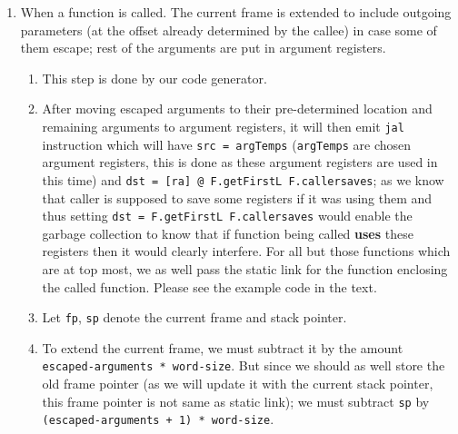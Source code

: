\begin{enumerate}
\def\labelenumi{\arabic{enumi}.}
\item
  When a function is called. The current frame is extended to include
  outgoing parameters (at the offset already determined by the callee)
  in case some of them escape; rest of the arguments are put in argument
  registers.

  \begin{enumerate}
  \def\labelenumii{\arabic{enumii}.}
  \item
    This step is done by our code generator.
  \item
    After moving escaped arguments to their pre-determined location and
    remaining arguments to argument registers, it will then emit
    \texttt{jal}
    instruction which will have
    \texttt{src = argTemps}
    (\texttt{argTemps}
    are chosen argument registers, this is done as these argument
    registers are used in this time) and
    \texttt{dst = [ra] @ F.getFirstL F.callersaves};
    as we know that caller is supposed to save some registers if it was
    using them and thus setting
    \texttt{dst = F.getFirstL F.callersaves}
    would enable the garbage collection to know that if function being
    called \textbf{uses} these registers then it would clearly
    interfere. For all but those functions which are at top most, we as well pass the static link for the function enclosing the called function. Please see the example code in the text. 
  \item
    Let
    \texttt{fp},
    \texttt{sp}
    denote the current frame and stack pointer.
  \item
    To extend the current frame, we must subtract it by the amount
    \texttt{escaped-arguments * word-size}.
    But since we should as well store the old frame pointer (as we will
    update it with the current stack pointer, this frame pointer is not same as static link); we must subtract
    \texttt{sp}
    by
    \texttt{(escaped-arguments + 1) * word-size}.

\end{enumerate}
\end{enumerate}
